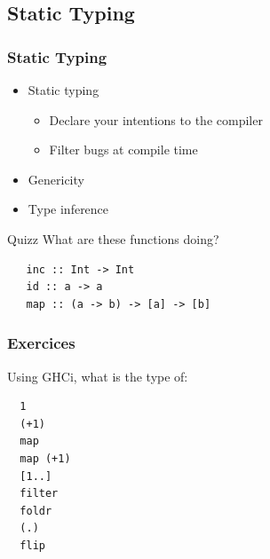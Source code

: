 \documentclass{beamer}
\begin{document}
\subsection{Static Typing}
\begin{frame}[fragile]
\frametitle{Static Typing}

 \begin{itemize}
  \item Static typing
   \begin{itemize}
    \item Declare your intentions to the compiler
    \item Filter bugs at compile time
   \end{itemize}
  \item Genericity
  \item Type inference
 \end{itemize}
 
 \vspace{0.5cm}
 \begin{block}{Quizz}
  What are these functions doing?
  \begin{lstlisting}
   inc :: Int -> Int 
   id :: a -> a 
   map :: (a -> b) -> [a] -> [b]
  \end{lstlisting}
 \end{block}

\end{frame}

\begin{frame}[fragile]
\frametitle{Exercices}

 Using GHCi, what is the type of:
 \begin{lstlisting}
  1
  (+1)
  map 
  map (+1)
  [1..]
  filter
  foldr
  (.)
  flip
 \end{lstlisting}
 
\end{frame}
\end{document}
